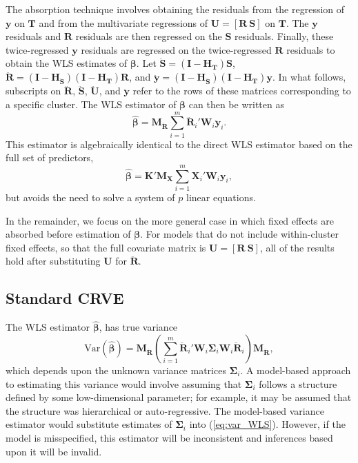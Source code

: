 \documentclass[12pt]{article}\usepackage[]{graphicx}\usepackage[]{color}
\newcommand{\Var}{\text{Var}}
\newcommand{\bm}{\mathbf}
\newcommand{\bs}{\boldsymbol}
\begin{document}
The absorption technique involves obtaining the residuals from the regression of $\bm{y}$ on $\bm{T}$ and from the multivariate regressions of $\bm{U} = [\bm{R}\ \bm{S}]$ on $\bm{T}$. 
The $\bm{y}$ residuals and $\bm{R}$ residuals are then regressed on the $\bm{S}$ residuals. 
Finally, these twice-regressed $\bm{y}$ residuals are regressed on the twice-regressed $\bm{R}$ residuals to obtain the WLS estimates of $\bs\beta$. 
Let $\bm{\ddot{S}} = \left(\bm{I} - \bm{H_T}\right)\bm{S}$, $\bm{\ddot{R}} = \left(\bm{I} - \bm{H_{\ddot{S}}}\right)\left(\bm{I} - \bm{H_T}\right)\bm{R}$, and $\bm{\ddot{y}} = \left(\bm{I} - \bm{H_{\ddot{S}}}\right)\left(\bm{I} - \bm{H_T}\right)\bm{y}$. 
In what follows, subscripts on $\bm{\ddot{R}}$, $\bm{\ddot{S}}$,  $\bm{\ddot{U}}$, and $\bm{\ddot{y}}$ refer to the rows of these matrices corresponding to a specific cluster. 
The WLS estimator of $\bs\beta$ can then be written as
\begin{equation}
\label{eq:WLS}
\bs{\hat\beta} = \bm{M_{\ddot{R}}} \sum_{i=1}^m \bm{\ddot{R}}_i' \bm{W}_i \bm{\ddot{y}}_i. 
\end{equation}
This estimator is algebraically identical to the direct WLS estimator based on the full set of predictors, \[
\bs{\hat\beta} = \bm{K}'\bm{M_X} \sum_{i=1}^m \bm{X}_i' \bm{W}_i \bm{y}_i,
\]
but avoids the need to solve a system of $p$ linear equations.

In the remainder, we focus on the more general case in which fixed effects are absorbed before estimation of $\bs\beta$. For models that do not include within-cluster fixed effects, so that the full covariate matrix is $\bm{U} = \left[\bm{R} \ \bm{S}\right]$, all of the results hold after substituting $\bm{U}$ for $\bm{\ddot{R}}$. 

\subsection{Standard CRVE}

The WLS estimator $\bs{\hat\beta}$, has true variance
\begin{equation}
\label{eq:var_WLS}
\Var\left(\bs{\hat\beta}\right) = \bm{M_{\ddot{R}}}\left(\sum_{i=1}^m \bm{\ddot{R}}_i' \bm{W}_i \bs\Sigma_i \bm{W}_i\bm{\ddot{R}}_i\right) \bm{M_{\ddot{R}}},
\end{equation}
which depends upon the unknown variance matrices $\bs\Sigma_i$. 
A model-based approach to estimating this variance would involve assuming that $\bm\Sigma_i$ follows a structure defined by some low-dimensional parameter; for example, it may be assumed that the structure was hierarchical or auto-regressive. 
The model-based variance estimator would substitute estimates of $\bs\Sigma_i$ into (\ref{eq:var_WLS}).
However, if the model is misspecified, this estimator will be inconsistent and inferences based upon it will be invalid.
\end{document}
